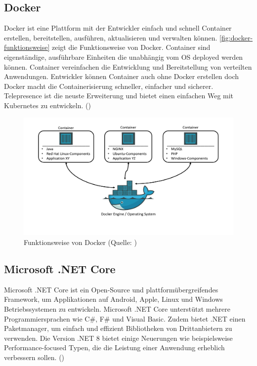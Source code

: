 \documentclass[a4paper, fontsize=11pt, parskip=half, twoside, headings=openright]{scrreprt}
\begin{document}
	\subsection{Docker}
	Docker ist eine Plattform mit der Entwickler einfach und schnell Container erstellen, bereitstellen, ausführen, aktualisieren und verwalten können.
	\autoref{fig:docker-funktionsweise} zeigt die Funktionsweise von Docker.
	Container sind eigenständige, ausführbare Einheiten die unabhängig vom OS deployed werden können.
	Container vereinfachen die Entwicklung und Bereitstellung von verteilten Anwendungen. 
	Entwickler können Container auch ohne Docker erstellen doch Docker macht die Containerisierung schneller, einfacher und sicherer. 
	Telepresence ist die neuste Erweiterung und bietet einen einfachen Weg mit Kubernetes zu entwickeln. (\textcite{ghosh_docker_2020})
	
	\begin{figure}[ht]
		\centering
		\includegraphics[scale=0.4]{assets/docker-funktionsweise.png}
		\caption{Funktionsweise von Docker (Quelle: \textcite{bollhoff_kubernetes_2022})}
		\label{fig:docker-funktionsweise}
	\end{figure}
	
	\subsection{Microsoft .NET Core} \label{subsec:msNetCore}
	Microsoft .NET Core ist ein Open-Source und plattformübergreifendes Framework, um Applikationen auf Android, Apple, Linux und Windows Betriebssystemen zu entwickeln.
	Microsoft .NET Core unterstützt mehrere Programmiersprachen wie C\#, F\# und Visual Basic.
	Zudem bietet .NET einen Paketmanager, um einfach und effizient Bibliotheken von Drittanbietern zu verwenden.
	Die Version .NET 8 bietet einige Neuerungen wie beispielsweise Performance-focused Typen, die die Leistung einer Anwendung erheblich verbessern sollen. (\textcite{billwagner_net_nodate})
\end{document}
